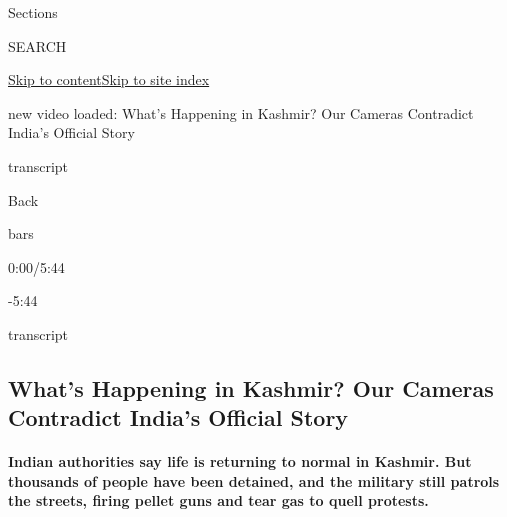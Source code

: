 Sections

SEARCH

\protect\hyperlink{site-content}{Skip to
content}\protect\hyperlink{site-index}{Skip to site index}

new video loaded: What's Happening in Kashmir? Our Cameras Contradict
India's Official Story

transcript

Back

bars

0:00/5:44

-5:44

transcript

\hypertarget{whats-happening-in-kashmir-our-cameras-contradict-indias-official-story}{%
\subsection{What's Happening in Kashmir? Our Cameras Contradict India's
Official
Story}\label{whats-happening-in-kashmir-our-cameras-contradict-indias-official-story}}

\hypertarget{indian-authorities-say-life-is-returning-to-normal-in-kashmir-but-thousands-of-people-have-been-detained-and-the-military-still-patrols-the-streets-firing-pellet-guns-and-tear-gas-to-quell-protests}{%
\paragraph{Indian authorities say life is returning to normal in
Kashmir. But thousands of people have been detained, and the military
still patrols the streets, firing pellet guns and tear gas to quell
protests.}\label{indian-authorities-say-life-is-returning-to-normal-in-kashmir-but-thousands-of-people-have-been-detained-and-the-military-still-patrols-the-streets-firing-pellet-guns-and-tear-gas-to-quell-protests}}

